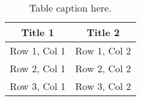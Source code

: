 \vspace{0.2em}


\begin{table}[h]
    \centering
    \begin{tabular}{|c|c|}
        \hline
        \textbf{Title 1} & \textbf{Title 2} \\
        \hline
        Row 1, Col 1 & Row 1, Col 2 \\
        Row 2, Col 1 & Row 2, Col 2 \\
        Row 3, Col 1 & Row 3, Col 2 \\
        \hline
    \end{tabular}
        \decoRule
        \caption{Table caption here.}
        \label{tab:table_caption}
\end{table}


\begin{quote}
    \centering
    \emph{}
\end{quote}